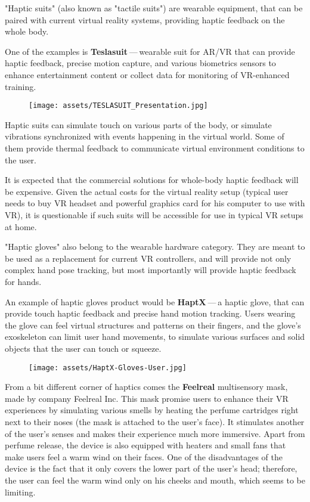 "Haptic suits" (also known as "tactile suits") are wearable
equipment, that can be paired with current virtual reality systems, providing
haptic feedback on the whole body.


One of the examples is \textbf{Teslasuit} — wearable suit for AR/VR that can provide
haptic feedback, precise motion capture, and various biometrics sensors to
enhance entertainment content or collect data for monitoring of
VR-enhanced training. \hyperlink{teslasuitab}{}


\begin{figure}[h]{}
\centering\texttt{[image: assets/TESLASUIT\_Presentation.jpg]}
\caption{}

\end{figure}

Haptic suits can simulate touch on various parts of the body, or simulate
vibrations synchronized with events happening in the virtual world. Some
of them provide thermal feedback to communicate virtual environment
conditions to the user.


It is expected that the commercial solutions for whole-body haptic feedback
will be expensive. Given the actual costs for the virtual reality setup
(typical user needs to buy VR headset and powerful graphics card for his computer
to use with VR), it is questionable if such suits will be
accessible for use in typical VR setups at home.



"Haptic gloves" also belong to the wearable hardware category. They are meant to be
used as a replacement for current VR controllers, and will provide not only
complex hand pose tracking, but most importantly will provide
haptic feedback for hands.


An example of haptic gloves product would be \textbf{HaptX} — a haptic
glove, that can provide touch haptic feedback and precise
hand motion tracking. Users wearing the glove can feel virtual structures
and patterns on their fingers, and the glove’s exoskeleton can limit user
hand movements, to simulate various surfaces and solid objects that the user can
touch or squeeze. \hyperlink{haptxtech}{}


\begin{figure}[h]{}
\centering\texttt{[image: assets/HaptX-Gloves-User.jpg]}
\caption{}

\end{figure}


From a bit different corner of haptics comes the \textbf{Feelreal} multisensory
mask, made by company Feelreal Inc. This mask promise users to enhance
their VR experiences by simulating various smells by heating the perfume
cartridges right next to their noses (the mask is attached to the user’s face).
It stimulates another of the user’s senses and makes their
experience much more immersive. Apart from perfume release, the device is
also equipped with heaters and small fans that make users feel a warm
wind on their faces. One of the disadvantages of the device is the fact that
it only covers the lower part of the user’s head; therefore, the user can feel
the warm wind only on his cheeks and mouth, which seems to be limiting.